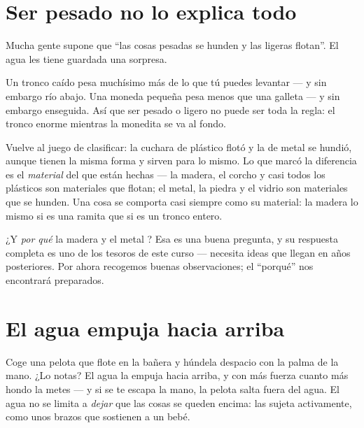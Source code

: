 \section{Ser pesado no lo explica todo}

Mucha gente supone que ``las cosas pesadas se hunden y las ligeras
flotan''. El agua les tiene guardada una sorpresa.

\begin{example}\label{ex:g1:floating-and-sinking:log}
Un tronco caído pesa muchísimo más de lo que tú puedes levantar --- y
sin embargo  río abajo. Una moneda pequeña pesa menos que una
galleta --- y sin embargo  enseguida. Así que ser pesado o
ligero no puede ser toda la regla: el tronco enorme  mientras
la monedita se va al fondo.
\end{example}

\begin{example}\label{ex:g1:floating-and-sinking:stuff}
Vuelve al juego de clasificar: la cuchara de plástico flotó y la de
metal se hundió, aunque tienen la misma forma y sirven para lo mismo.
Lo que marcó la diferencia es el \emph{material} del que están hechas
--- la madera, el corcho y casi todos los plásticos son materiales que
flotan; el metal, la piedra y el vidrio son materiales que se hunden.
Una cosa se comporta casi siempre como su material: la madera 
lo mismo si es una ramita que si es un tronco entero.
\end{example}

\begin{remark}\label{rem:g1:floating-and-sinking:why}
¿Y \emph{por qué} la madera  y el metal ? Esa es una
buena pregunta, y su respuesta completa es uno de los tesoros de este
curso --- necesita ideas que llegan en años posteriores. Por ahora
recogemos buenas observaciones; el ``porqué'' nos encontrará
preparados.
\end{remark}

\section{El agua empuja hacia arriba}

\begin{example}\label{ex:g1:floating-and-sinking:push}
Coge una pelota que flote en la bañera y húndela despacio con la palma
de la mano. ¿Lo notas? El agua la empuja hacia arriba, y con más
fuerza cuanto más hondo la metes --- y si se te escapa la mano, la
pelota salta fuera del agua. El agua no se limita a \emph{dejar} que
las cosas se queden encima: las sujeta activamente, como unos brazos
que sostienen a un bebé.
\end{example}

